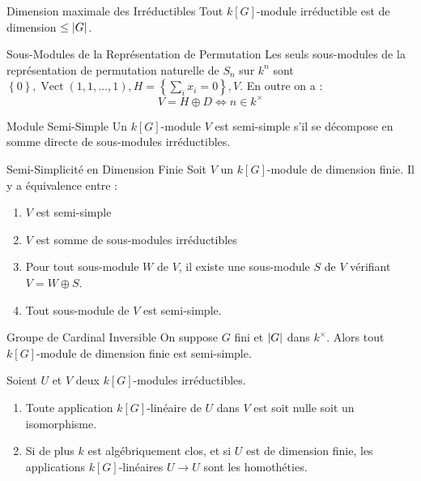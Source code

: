 \documentclass{cours}
\DeclareMathOperator{\Vect}{Vect}
\begin{document}
\begin{propositionfr}{Dimension maximale des Irréductibles}{}
    Tout $k[G]$-module irréductible est de dimension $\leq\left|G\right|$.
\end{propositionfr}

\begin{propositionfr}{Sous-Modules de la Représentation de Permutation}{}
    Les seuls sous-modules de la représentation de permutation naturelle de $S_{n}$ sur $k^{n}$ sont $\left\{0\right\}, \Vect(1, 1,\ldots, 1), H = \left\{\sum_{i} x_{i} = 0\right\}, V$. En outre on a :
    \[
        V = H \oplus D \Longleftrightarrow n \in k^{\times}
    \]
\end{propositionfr}

\begin{définition}{Module Semi-Simple}{}
    Un $k[G]$-module $V$ est semi-simple s'il se décompose en somme directe de sous-modules irréductibles.
\end{définition}

\begin{propositionfr}{Semi-Simplicité en Dimension Finie}{}
    Soit $V$ un $k[G]$-module de dimension finie. Il y a équivalence entre :
    \begin{enumerate}
        \item $V$ est semi-simple
        \item $V$ est somme de sous-modules irréductibles
        \item Pour tout sous-module $W$ de $V$, il existe une sous-module $S$ de $V$ vérifiant $V = W \oplus S$.
        \item Tout sous-module de $V$ est semi-simple.
    \end{enumerate}
\end{propositionfr}

\begin{théorème}{Groupe de Cardinal Inversible}{}
    On suppose $G$ fini et $\left|G\right|$ dans $k^{\times}$. Alors tout $k[G]$-module de dimension finie est semi-simple.
\end{théorème}

\begin{lemma}
    Soient $U$ et $V$ deux $k[G]$-modules irréductibles.
    \begin{enumerate}
        \item Toute application $k[G]$-linéaire de $U$ dans $V$ est soit nulle soit un isomorphisme.
        \item Si de plus $k$ est algébriquement clos, et si $U$ est de dimension finie, les applications $k[G]$-linéaires $U \rightarrow U$ sont les homothéties.
    \end{enumerate}
\end{lemma}
\end{document}
